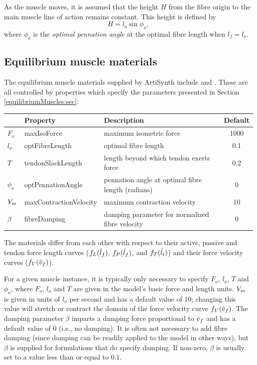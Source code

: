 As the muscle moves, it is assumed that the height $H$ from the fibre
origin to the main muscle line of action remains constant.
This height is defined by
%
\begin{equation*}
H = l_o \sin \phi_o,
\end{equation*}
%
where $\phi_o$ is the {\it optimal pennation angle} at the optimal
fibre length when $l_f = l_o$.

\subsection{Equilibrium muscle materials}
\label{EquilibriumMuscleMaterials:sec}

The equilibrium muscle materials supplied by ArtiSynth include
 and
.  These
are all controlled by properties which specify the parameters
presented in Section \ref{equilibriumMuscles:sec}:

\begin{center}
\begin{tabular}{|l|l|l|c|} 
\hline
& Property & Description & Default\\
\hline
$F_{o}$ & {\sf maxIsoForce} & 
maximum isometric force & 1000 \\
$l_o$ & {\sf optFibreLength} & 
optimal fibre length & 0.1 \\
$T$ & {\sf tendonSlackLength} & 
length beyond which tendon exerts force & 0.2 \\
$\phi_o$ & {\sf optPennationAngle} & 
pennation angle at optimal fibre length (radians) & 0 \\
$V_{m}$ & {\sf maxContractionVelocity} & 
maximum contraction velocity & 10 \\
$\beta$ & {\sf fibreDamping} & 
damping parameter for normalized fibre velocity & 0 \\
\hline
\end{tabular}
\end{center}

The materials differ from each other with respect to their active,
passive and tendon force length curves ($f_L(\hat{l}_f)$, $f_P(\hat{l}_f)$, and
$f_T(\hat{l}_t)$) and their force velocity curves ($f_V(\hat{v}_f)$).

For a given muscle instance, it is typically only necessary to specify
$F_o$, $l_o$, $T$ and $\phi_o$, where $F_o$, $l_o$ and $T$ are given
in the model's basic force and length units. $V_{m}$ is given in units
of $l_o$ per second and has a default value of 10; changing this value
will stretch or contract the domain of the force velocity curve
$f_V(\hat{v}_f)$. The damping parameter $\beta$ imparts a damping force
proportional to $\hat{v}_f$ and has a default value of 0 (i.e., no
damping). It is often not necessary to add fibre damping (since
damping can be readily applied to the model in other ways), but
$\beta$ is supplied for formulations that do specify damping.  If
non-zero, $\beta$ is usually set to a value less than or equal to
$0.1$.

